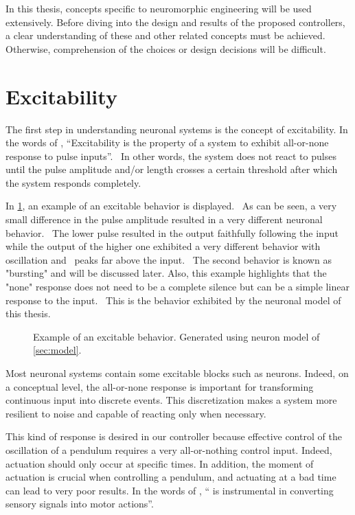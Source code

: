 \label{sec:neuro_expl}

In this thesis, concepts specific to neuromorphic engineering will be used extensively.
Before diving into the design and results of the proposed controllers, a clear understanding of these and other related concepts must be achieved.
Otherwise, comprehension of the choices or design decisions will be difficult.

\section{Excitability}

The first step in understanding neuronal systems is the concept of excitability. 
In the words of \citet{excDef}, \enquote{Excitability is the property of a system to exhibit all-or-none response to pulse inputs}. 
In other words, the system does not react to pulses until the pulse amplitude and/or length crosses a certain threshold after which the system responds completely. 

In \cref{fig:excitability}, an example of an excitable behavior is displayed. 
As can be seen, a very small difference in the pulse amplitude resulted in a very different neuronal behavior. 
The lower pulse resulted in the output faithfully following the input while the output of the higher one exhibited a very different behavior with oscillation and  peaks far above the input. 
The second behavior is known as "bursting" and will be discussed later.
Also, this example highlights that the "none" response does not need to be a complete silence but can be a simple linear response to the input. 
This is the behavior exhibited by the neuronal model of this thesis.

\begin{figure}[htb]
    \centering
    \caption{Example of an excitable behavior. Generated using neuron model of \cref{sec:model}.}
    \label{fig:excitability}
\end{figure}

Most neuronal systems contain some excitable blocks such as neurons. 
Indeed, on a conceptual level, the all-or-none response is important for transforming continuous input into discrete events. 
This discretization makes a system more resilient to noise and capable of reacting only when necessary.

This kind of response is desired in our controller because effective control of the oscillation of a pendulum requires a very all-or-nothing control input.
Indeed, actuation should only occur at specific times. In addition, the moment of actuation is crucial when controlling a pendulum, and actuating at a bad time can lead to very poor results.
In the words of \citet{excDef}, \enquote{ is instrumental in converting sensory signals into motor actions}.

